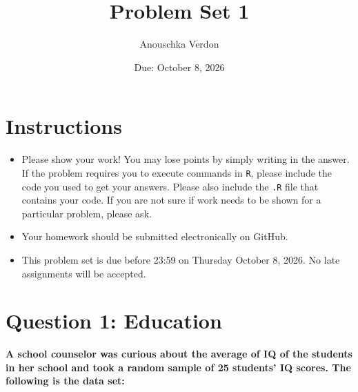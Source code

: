 \documentclass[12pt,letterpaper]{article}
\title{\textbf{Problem Set 1}}
\date{Due: October 8, 2026}
\author{Anouschka Verdon}
\begin{document}
	\maketitle
	
	\section*{Instructions}
	\begin{itemize}
	\item Please show your work! You may lose points by simply writing in the answer. If the problem requires you to execute commands in \texttt{R}, please include the code you used to get your answers. Please also include the \texttt{.R} file that contains your code. If you are not sure if work needs to be shown for a particular problem, please ask.
\item Your homework should be submitted electronically on GitHub.
\item This problem set is due before 23:59 on Thursday October 8, 2026. No late assignments will be accepted.
	\end{itemize}
	
	\vspace{0 cm}
	\section*{Question 1: Education}

\textbf{A school counselor was curious about the average of IQ of the students in her school and took a random sample of 25 students' IQ scores. The following is the data set:}\\
\vspace{0cm}

  


\vspace{0cm}
\end{document}
